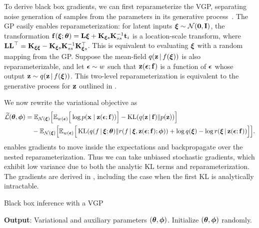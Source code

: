 To derive black box gradients, we can first reparameterize the
\gls{VGP}, separating noise generation of samples from
the parameters in its generative
process~\citep{kingma2014autoencoding,rezende2014stochastic}. The
\gls{GP} easily enables reparameterization:
for latent inputs $\boldsymbol{\mathbf{\xi}}\sim\mathcal{N}(\boldsymbol{\mathbf{0}},\boldsymbol{\mathbf{I}})$,
the transformation
$\mathbf{f}(\boldsymbol{\mathbf{\xi}};\boldsymbol{\mathbf{\theta}})=\boldsymbol{\mathbf{L}}\boldsymbol{\mathbf{\xi}} + \mathbf{K}_{\boldsymbol{\mathbf{\xi}} s} \mathbf{K}_{ss}^{-1} \mathbf{t}_i$
is a location-scale transform,
where $\boldsymbol{\mathbf{L}}\boldsymbol{\mathbf{L}}^\top = \mathbf{K}_{\boldsymbol{\mathbf{\xi}}\boldsymbol{\mathbf{\xi}}} - \mathbf{K}_{\boldsymbol{\mathbf{\xi}} s} \mathbf{K}_{ss}^{-1} \mathbf{K}_{\boldsymbol{\mathbf{\xi}} s}^\top$.
This is equivalent to evaluating $\boldsymbol{\mathbf{\xi}}$ with a random mapping
from the \gls{GP}.
Suppose the mean-field $q(\boldsymbol{\mathbf{z}}\,|\, f(\boldsymbol{\mathbf{\xi}}))$ is also reparameterizable,
and let $\boldsymbol{\mathbf{\epsilon}}\sim w$ such that $\boldsymbol{\mathbf{z}}(\boldsymbol{\mathbf{\epsilon}};\mathbf{f})$ is a
function of $\boldsymbol{\mathbf{\epsilon}}$ whose output $\boldsymbol{\mathbf{z}}\sim q(\boldsymbol{\mathbf{z}}\,|\, f(\boldsymbol{\mathbf{\xi}}))$.
This two-level reparameterization is equivalent to the generative
process for $\boldsymbol{\mathbf{z}}$ outlined in .


We now rewrite the variational objective as
\begin{align}
\label{eq:reparam_objective}
\widetilde{\cL}(\mbtheta,\mbphi)
&
=
\mathbb{E}_{\mathcal{N}(\mbxi)}\Big[\mathbb{E}_{w(\mbepsilon)}\Big[
\log p(\mbx\mid\mbz(\mbepsilon;\f))
\Big]
-
\operatorname{KL}(q(\mbz\g \f)\|p(\mbz))
\Big]
\\
&
\quad
-
\mathbb{E}_{\mathcal{N}(\mbxi)}\Big[\mathbb{E}_{w(\mbepsilon)}\Big[
\operatorname{KL}(q(f\g\mbxi;\mbtheta)\|r(f\g\mbxi,\mbz(\mbepsilon;\f);\mbphi))
+
\log q(\mbxi) - \log r(\mbxi\g\mbz(\mbepsilon;\f))
\Big]\Big].
\nonumber
\end{align}
 enables gradients to move inside the expectations and backpropagate over
the nested reparameterization. Thus we can take unbiased stochastic
gradients, which exhibit low variance due to both the analytic
KL terms and reparameterization.
The gradients are derived in
, including the case when the first KL is
analytically intractable.

\begin{algorithm}[t]
  \caption{Black box inference with a \acrlong{VGP}}
  \SetAlgoLined
  \DontPrintSemicolon
  \BlankLine
  \BlankLine
  \textbf{Output}: Variational and auxiliary parameters
  $(\boldsymbol{\mathbf{\theta}},\boldsymbol{\mathbf{\phi}})$.\;
  \BlankLine
  Initialize $(\boldsymbol{\mathbf{\theta}},\boldsymbol{\mathbf{\phi}})$ randomly.
  \BlankLine
  \label{alg:vgp}
\end{algorithm}

